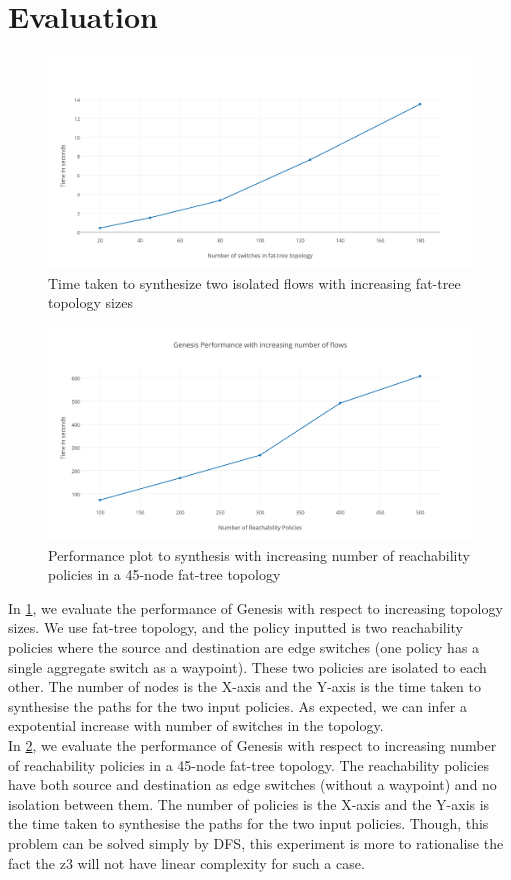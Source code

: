 \documentclass[]{sig}
\begin{document}
\section{Evaluation}
\begin{figure} 
	\includegraphics[width=20cm]{GenesisTopo.png}
	\caption{Time taken to synthesize two isolated flows with increasing fat-tree topology sizes}
	\label{fig:topo}
\end{figure}
\begin{figure} 
	\includegraphics[width=20cm]{GenesisReach.png}
	\caption{Performance plot to synthesis with increasing number of reachability policies in a 45-node fat-tree topology}
	\label{fig:reach}
\end{figure}
In \cref{fig:topo}, we evaluate the performance of Genesis with respect to increasing topology sizes. We use fat-tree topology, and the policy inputted is two reachability policies where the source and destination are edge switches (one policy has a single aggregate switch as a waypoint). These two policies are isolated to each other. The number of nodes is the X-axis and the Y-axis is the time taken to synthesise the paths for the two input policies. As expected, we can infer a expotential increase with number of switches in the topology. \\
In \cref{fig:reach}, we evaluate the performance of Genesis with respect to increasing number of reachability policies in a 45-node fat-tree topology. The reachability policies have both source and destination as edge switches (without a waypoint) and no isolation between them. The number of policies is the X-axis and the Y-axis is the time taken to synthesise the paths for the two input policies. Though, this problem can be solved simply by DFS, this experiment is more to rationalise the fact the z3 will not have linear complexity for such a case.
\end{document}

